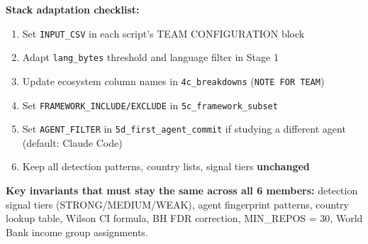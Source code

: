 \documentclass[9pt,a4paper]{article}
\begin{document}
\vspace{3pt}
\noindent\textbf{Stack adaptation checklist:}
\begin{enumerate}[leftmargin=1.5em,itemsep=0pt,topsep=1pt]
  \item Set \texttt{INPUT\_CSV} in each script's TEAM CONFIGURATION block
  \item Adapt \texttt{lang\_bytes} threshold and language filter in Stage 1
  \item Update ecosystem column names in \texttt{4c\_breakdowns} (\texttt{NOTE FOR TEAM})
  \item Set \texttt{FRAMEWORK\_INCLUDE/EXCLUDE} in \texttt{5c\_framework\_subset}
  \item Set \texttt{AGENT\_FILTER} in \texttt{5d\_first\_agent\_commit} if studying
        a different agent (default: Claude Code)
  \item Keep all detection patterns, country lists, signal tiers \textbf{unchanged}
\end{enumerate}

\vspace{5pt}
\noindent\colorbox{yellow!30}{\parbox{0.95\linewidth}{
\textbf{Key invariants that must stay the same across all 6 members:}
detection signal tiers (STRONG/MEDIUM/WEAK), agent fingerprint patterns,
country lookup table, Wilson CI formula, BH FDR correction,
MIN\_REPOS = 30, World Bank income group assignments.
}}
\end{document}
